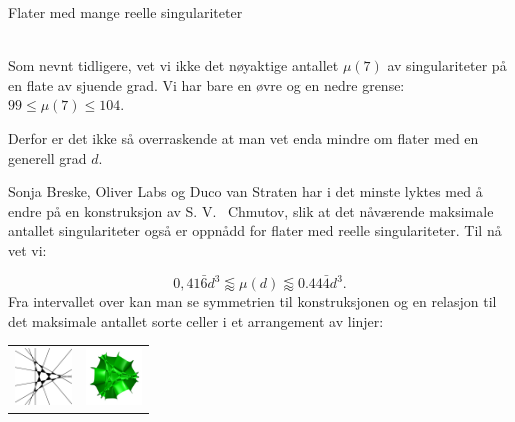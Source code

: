 \documentclass[no]{./../../common/SurferDesc}%
\begin{document}
\footnotesize




\begin{surferPage}
  \begin{surferTitle}Flater med mange reelle singulariteter\end{surferTitle}   \\
  
    Som nevnt tidligere, vet vi ikke det nøyaktige antallet 
    $\mu(7)$ av singulariteter på en flate av sjuende grad.
    Vi har bare en øvre og en nedre grense: $99\le \mu(7) \le 104$. 

	Derfor er det ikke så overraskende at man vet enda mindre om flater med en generell grad $d$.
	
	Sonja Breske, Oliver Labs og Duco van Straten har i det minste lyktes med å endre på en konstruksjon 
	av S. V. \ Chmutov, slik at det nåværende maksimale antallet
	singulariteter også er oppnådd for flater med reelle singulariteter. Til nå vet vi:
 
    \[0,41\bar{6}d^3 \lessapprox \mu(d) \lessapprox 0.44\bar{4} d^3.\]
Fra intervallet over kan man se symmetrien til konstruksjonen og en relasjon til det maksimale antallet sorte celler i et arrangement av linjer:
    \begin{center}
      \begin{tabular}{c@{\qquad}c}
        \includegraphics[height=1.5cm]{./../../common/images/vielesing.pdf}
        &
        \includegraphics[height=1.5cm]{./../../common/images/p9surface_von_oben}
      \end{tabular}
    \end{center}

  \begin{surferText}
     \end{surferText}
\end{surferPage}
\end{document}
